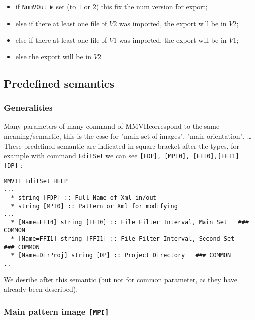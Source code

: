 \documentclass[a4paper]{book}
\newcommand{\PPP}{MMVII}
\begin{document}
{\begin{itemize}
    \item if {\tt NumVOut} is set (to $1$ or $2$) this fix the num version for export;
    \item else if there at least one file of $V2$ was imported, the export will be in $V2$;
    \item else if there at least one file of $V1$ was imported, the export will be in $V1$;
    \item else  the export will be in $V2$;
\end{itemize}


\subsection{Predefined semantics}

\label{Param:Pred:Sem}


\subsubsection{Generalities}

Many parameters of many command of \PPP correspond to the same meaning/semantic,
this is  the case for "main set of images", "main orientation", \dots These predefined
semantic are indicated in square bracket after the types, for example with command
{\tt EditSet} we can see {\tt [FDP], [MPI0], [FFI0],[FFI1] [DP]} :


\begin{verbatim}
MMVII EditSet HELP
...
  * string [FDP] :: Full Name of Xml in/out
  * string [MPI0] :: Pattern or Xml for modifying
...
  * [Name=FFI0] string [FFI0] :: File Filter Interval, Main Set   ### COMMON 
  * [Name=FFI1] string [FFI1] :: File Filter Interval, Second Set   ### COMMON 
  * [Name=DirProj] string [DP] :: Project Directory   ### COMMON 
..
\end{verbatim}

We desribe after this semantic (but not for common parameter, as they have already been described).



\subsubsection{Main pattern image {\tt [MPI]}}

}
\end{document}
